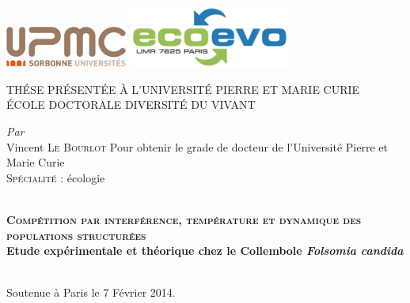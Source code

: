 
\begin{titlingpage}
\begin{Spacing}{1}
\begin{center}     

\includegraphics[width=0.3\textwidth]{0_Title/upmc.png}\hfill
\includegraphics[width=0.4\textwidth]{0_Title/LogoLabo.png}\\[1cm]
 
\begin{Spacing}{1.5}
\textsc{\LARGE THÉSE PRÉSENTÉE À L'UNIVERSITÉ PIERRE ET MARIE
CURIE}\\[0.8cm]

\textsc{ÉCOLE DOCTORALE DIVERSITÉ DU VIVANT}
\end{Spacing} 
\vfill

\emph{Par}\\ 
Vincent \textsc{Le Bourlot} \vfill
Pour obtenir le grade de docteur de l'Université Pierre et Marie Curie\\
\textsc{Spécialité} : écologie\\

\vfill


\HRule \\[0.2cm] 
{\textbf{\LARGE\textsc{Compétition par interférence, température et dynamique
des populations structurées}\\[0.7cm] \Large Etude expérimentale et théorique
chez le Collembole \textit{Folsomia candida}}}\\[0.2cm] \HRule \\ 

\vfill
\end{center} 
Soutenue à Paris le 7 Février 2014.\\
\vfill

\begin{flushleft}
\begingroup
    \fontsize{11pt}{12pt}\selectfont



\end{flushleft}
\end{Spacing}
\end{titlingpage}
